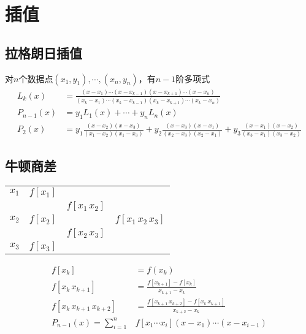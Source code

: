 \documentclass[twocolumn]{article}
\begin{document}
\section{插值}

\subsection{拉格朗日插值}
对$n$个数据点$(x_1,y_1),\cdots,(x_n,y_n)$，有$n-1$阶多项式
\begin{align*}
    L_k(x)     & =\frac{(x-x_1)\cdots(x-x_{k-1})(x-x_{k+1})\cdots(x-x_n)}{(x_k-x_1)\cdots(x_k-x_{k-1})(x_k-x_{k+1})\cdots(x_k-x_n)}                      \\
    P_{n-1}(x) & =y_1L_1(x)+\cdots+y_nL_n(x)                                                                                                             \\
    P_2(x)     & =y_1\frac{(x-x_2)(x-x_3)}{(x_1-x_2)(x_1-x_3)}+y_2\frac{(x-x_3)(x-x_1)}{(x_2-x_3)(x_2-x_1)}+y_3\frac{(x-x_1)(x-x_2)}{(x_3-x_1)(x_3-x_2)}
\end{align*}

\subsection{牛顿商差}
\noindent
\begin{minipage}{0.42\linewidth}
    \begin{center}
        \begin{tabular}{c|ccc}
            $x_1$ & $f[x_1]$ &                 &                        \\
                  &          & $f[x_1 \, x_2]$ &                        \\
            $x_2$ & $f[x_2]$ &                 & $f[x_1 \, x_2 \, x_3]$ \\
                  &          & $f[x_2 \, x_3]$ &                        \\
            $x_3$ & $f[x_3]$ &                 &
        \end{tabular}
    \end{center}
\end{minipage}
\begin{minipage}{0.5\linewidth}
    \begin{align*}
        f[x_k]                       & =f(x_k)                                                      \\
        f[x_k \, x_{k+1}]            & =\frac{f[x_{k+1}]-f[x_k]}{x_{k+1}-x_k}                       \\
        f[x_k \, x_{k+1} \, x_{k+2}] & =\frac{f[x_{k+1} \, x_{k+2}]-f[x_k \, x_{k+1}]}{x_{k+2}-x_k} \\
        P_{n-1}(x)=\sum_{i=1}^n      & f[x_1\cdots x_i](x-x_1)\cdots(x-x_{i-1})
    \end{align*}
\end{minipage}
\end{document}
